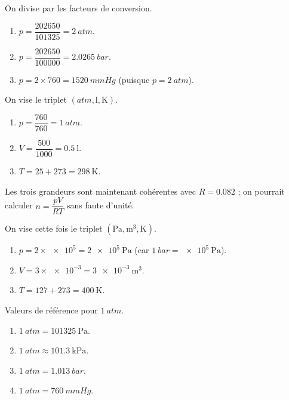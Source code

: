 \documentclass[11pt,a4paper]{article}
\begin{document}
\begin{corrige}
On divise par les facteurs de conversion.
\begin{enumerate}[label=\alph*)]
  \item $p=\dfrac{202650}{101325}=\qty{2}{atm}$.
  \item $p=\dfrac{202650}{100000}=\qty{2.0265}{bar}$.
  \item $p=2\times760=\qty{1520}{mmHg}$ (puisque $p=\qty{2}{atm}$).
\end{enumerate}
\end{corrige}

\begin{corrige}[préparer $pV=nRT$ avec $R=\num{0,082}$]
On vise le triplet $(\si{atm},\si{\litre},\si{\kelvin})$.
\begin{enumerate}[label=\alph*)]
  \item $p=\dfrac{760}{760}=\qty{1}{atm}$.
  \item $V=\dfrac{500}{1000}=\qty{0.5}{\litre}$.
  \item $T=25+273=\qty{298}{\kelvin}$.
\end{enumerate}
Les trois grandeurs sont maintenant cohérentes avec $R=\num{0,082}$ ; on pourrait calculer
$n=\dfrac{pV}{RT}$ sans faute d'unité.
\end{corrige}

\begin{corrige}[préparer $pV=nRT$ avec $R=\num{8,314}$]
On vise cette fois le triplet $(\si{\pascal},\si{\meter\cubed},\si{\kelvin})$.
\begin{enumerate}[label=\alph*)]
  \item $p=2\times\num{e5}=\qty{2e5}{\pascal}$ (car $\qty{1}{bar}=\qty{e5}{\pascal}$).
  \item $V=3\times\num{e-3}=\qty{3e-3}{\meter\cubed}$.
  \item $T=127+273=\qty{400}{\kelvin}$.
\end{enumerate}
\end{corrige}

\begin{corrige}
Valeurs de référence pour $\qty{1}{atm}$.
\begin{enumerate}[label=\alph*)]
  \item $\qty{1}{atm}=\qty{101325}{\pascal}$.
  \item $\qty{1}{atm}\approx\qty{101.3}{\kilo\pascal}$.
  \item $\qty{1}{atm}=\qty{1.013}{bar}$.
  \item $\qty{1}{atm}=\qty{760}{mmHg}$.
\end{enumerate}
\end{corrige}
\end{document}
